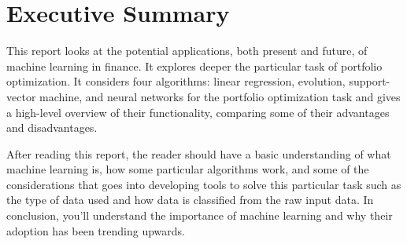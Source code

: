 \documentclass[12pt]{report}
\begin{document}

\newpage\thispagestyle{fancy}\sectionfont{\scshape}
\section*{\centering Executive Summary}

This report looks at the potential applications, both present and future, of machine learning in finance. It explores deeper the particular task of portfolio optimization. It considers four algorithms: linear regression, evolution, support-vector machine, and neural networks for the portfolio optimization task and gives a high-level overview of their functionality, comparing some of their advantages and disadvantages.

After reading this report, the reader should have a basic understanding of what machine learning is, how some particular algorithms work, and some of the considerations that goes into developing tools to solve this particular task such as the type of data used and how data is classified from the raw input data. In conclusion, you'll understand the importance of machine learning and why their adoption has been trending upwards.



\newpage\thispagestyle{fancy}\sectionfont{\scshape}

\setcounter{page}{1}
\fancyfoot[C]{\thepage}
\end{document}

